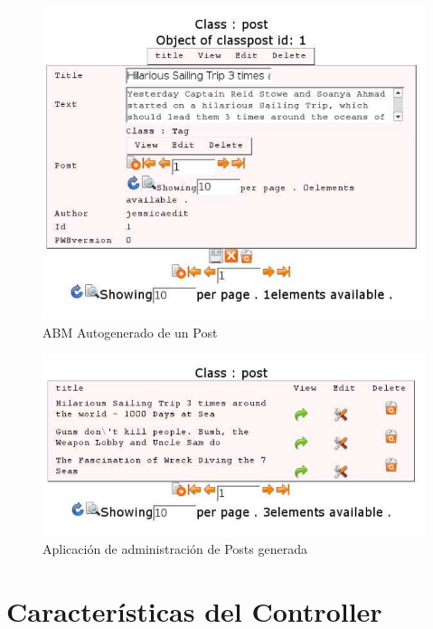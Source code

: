 \begin{figure}[h]
	\centering
	\includegraphics[scale=0.7]{images/abm1.pdf}
 	\caption{ABM Autogenerado de un Post}
 	\label{fig-abm1}
\end{figure}

\begin{figure}[h]
	\centering
	\includegraphics[scale=0.7]{images/abm2.pdf}
 	\caption{Aplicación de administración de Posts generada}
 	\label{fig-abm2}
\end{figure}


\section{Características del Controller}
\label{sec-controller}

